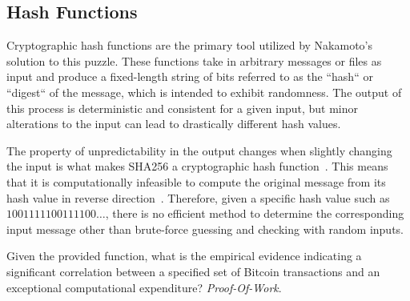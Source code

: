 \subsection{Hash Functions}
Cryptographic hash functions are the primary tool utilized by Nakamoto's solution to this puzzle. These functions take in
arbitrary messages or files as input and produce a fixed-length string of bits referred to as the ``hash`` or ``digest`` of
the message, which is intended to exhibit randomness. The output of this process is deterministic and consistent for a
given input, but minor alterations to the input can lead to drastically different hash values.

The property of unpredictability in the output changes when slightly changing the input is what makes SHA256 a cryptographic
hash function~\cite{dang2015secure}. This means that it is computationally infeasible to compute the original message
from its hash value in reverse direction~\cite{butin2017hash}. Therefore, given a specific hash value such as
$1001111100111100\ldots$, there is no efficient method to determine the corresponding input message other than brute-force
guessing and checking with random inputs.

Given the provided function, what is the empirical evidence indicating a significant correlation between a specified set
of Bitcoin transactions and an exceptional computational expenditure? \emph{Proof-Of-Work}.
